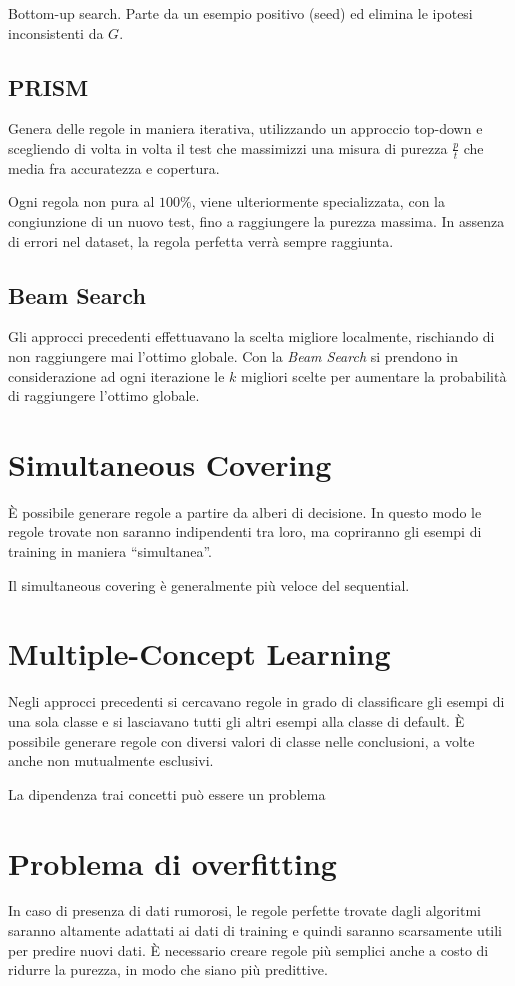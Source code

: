\documentclass[11pt,onecolumn,a4paper,oneside]{book}
\begin{document}
	Bottom-up search. Parte da un esempio positivo (seed) ed elimina le ipotesi inconsistenti da $G$.
	
	\subsection{PRISM}
	Genera delle regole in maniera iterativa, utilizzando un approccio top-down e scegliendo di volta in volta il test che massimizzi una misura di purezza $\frac{p}{t}$ che media fra accuratezza e copertura.
	
	Ogni regola non pura al $100\%$, viene ulteriormente specializzata, con la congiunzione di un nuovo test, fino a raggiungere la purezza massima. In assenza di errori nel dataset, la regola perfetta verrà sempre raggiunta.

	\subsection{Beam Search}
	Gli approcci precedenti effettuavano la scelta migliore localmente, rischiando di non raggiungere mai l'ottimo globale.
	Con la \emph{Beam Search} si prendono in considerazione ad ogni iterazione le $k$ migliori scelte per aumentare la probabilità di raggiungere l'ottimo globale.

	\section{Simultaneous Covering}
È possibile generare regole a partire da alberi di decisione.
In questo modo le regole trovate non saranno indipendenti tra loro, ma copriranno gli esempi di training in maniera ``simultanea''.

Il simultaneous covering è generalmente più veloce del sequential.

	\section{Multiple-Concept Learning}
	Negli approcci precedenti si cercavano regole in grado di classificare gli esempi di una sola classe e si lasciavano tutti gli altri esempi alla classe di default.
	È possibile generare regole con diversi valori di classe nelle conclusioni, a volte anche non mutualmente esclusivi.
	
	La dipendenza trai concetti può essere un problema
	
	
	\section{Problema di overfitting}
	In caso di presenza di dati rumorosi, le regole perfette trovate dagli algoritmi saranno altamente adattati ai dati di training e quindi saranno scarsamente utili per predire nuovi dati.
	È necessario creare regole più semplici anche a costo di ridurre la purezza, in modo che siano più predittive.
	
\end{document}
